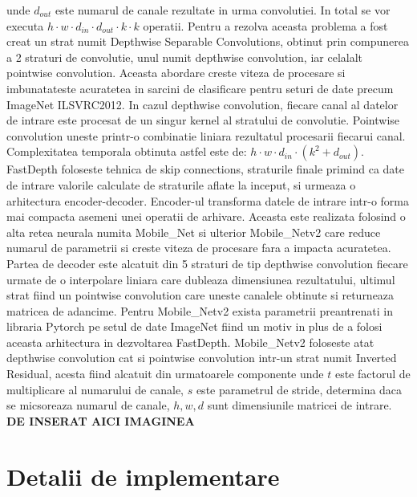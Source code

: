 \documentclass[12pt,a4paper]{report}
\begin{document}
unde \(d_{out}\) este numarul de canale rezultate in urma convolutiei.
In total se vor executa $ h \cdot w \cdot d_{in} \cdot d_{out} \cdot k \cdot k$ operatii.
Pentru  a rezolva aceasta problema a fost creat un strat numit Depthwise Separable Convolutions, 
obtinut prin compunerea a 2 straturi de convolutie, unul numit depthwise convolution,
iar celalalt pointwise convolution. Aceasta abordare creste viteza de procesare si imbunatateste
acuratetea in sarcini de clasificare pentru seturi de date precum ImageNet ILSVRC2012. In cazul 
depthwise convolution, fiecare canal al datelor de intrare este procesat de un singur kernel
al stratului de convolutie. Pointwise convolution uneste printr-o combinatie liniara 
rezultatul procesarii fiecarui canal. Complexitatea temporala obtinuta astfel este de:
$ h \cdot w \cdot d_{in} \cdot (k^2 + d_{out})$. \\ 

FastDepth foloseste tehnica de skip connections, straturile finale primind ca date de intrare
valorile calculate de straturile aflate la inceput, si urmeaza o arhitectura encoder-decoder. 
Encoder-ul transforma datele de intrare intr-o forma mai compacta asemeni unei operatii de arhivare.
Aceasta este realizata folosind o alta retea neurala numita Mobile\_Net si ulterior Mobile\_Netv2 
care reduce numarul de parametrii si creste viteza de procesare fara a impacta acuratetea. 
Partea de decoder este alcatuit din 5 straturi de tip depthwise convolution fiecare urmate de o 
interpolare liniara care dubleaza dimensiunea rezultatului, ultimul strat fiind un 
pointwise convolution care uneste canalele obtinute si returneaza matricea de adancime. Pentru
Mobile\_Netv2 exista parametrii preantrenati in libraria Pytorch pe setul de date ImageNet
fiind un motiv in plus de a folosi aceasta arhitectura in dezvoltarea FastDepth. 
Mobile\_Netv2 foloseste atat depthwise convolution cat si pointwise convolution intr-un
strat numit Inverted Residual, acesta fiind alcatuit din urmatoarele componente unde $ t $ 
este factorul de multiplicare al numarului de canale, $ s $ este parametrul de stride, determina 
daca se micsoreaza numarul de canale, $ h, w, d $ sunt dimensiunile matricei de intrare. \\

\textbf{DE INSERAT AICI IMAGINEA}


\chapter{Detalii de implementare}
\end{document}

